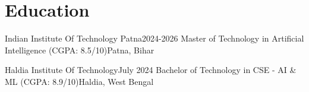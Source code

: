 \section{Education}
    \resumeSubHeadingListStart

    \resumeSubheading
    {Indian  Institute Of Technology Patna}{2024-2026}
    {Master of Technology in Artificial Intelligence (CGPA: 8.5/10)}{Patna, Bihar}

    \resumeSubheading
    {Haldia Institute Of Technology}{July 2024}
    {Bachelor of Technology in CSE - AI \& ML (CGPA: 8.9/10)}{Haldia, West Bengal}

    \resumeSubHeadingListEnd